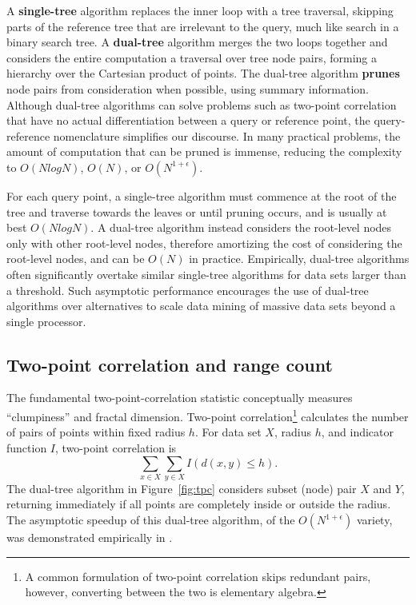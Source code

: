 \documentclass[twoside,leqno,twocolumn]{article}
\newcommand{\fig}[1]{Figure~\ref{fig:#1}}
\newcommand{\mysub}[1]{\subsection{#1} }
\newcommand{\defterm}[1]{{\bf #1}}
\begin{document}
A \defterm{single-tree} algorithm replaces the inner loop with a tree traversal, skipping parts of the reference tree that are irrelevant to the query, much like search in a binary search tree.
A \defterm{dual-tree} algorithm merges the two loops together and considers the entire computation a traversal over tree node pairs, forming a hierarchy over the Cartesian product of points.
The dual-tree algorithm \defterm{prunes} node pairs from consideration when possible, using summary information.
Although dual-tree algorithms can solve problems such as two-point correlation that have no actual differentiation between a query or reference point, the query-reference nomenclature simplifies our discourse.
In many practical problems, the amount of computation that can be pruned is immense, reducing the complexity to $O(N log N)$, $O(N)$, or $O(N^{1+\epsilon})$.

For each query point, a single-tree algorithm must commence at the root of the tree and traverse towards the leaves or until pruning occurs, and is usually at best $O(N log N)$.
A dual-tree algorithm instead considers the root-level nodes only with other root-level nodes, therefore amortizing the cost of considering the root-level nodes, and can be $O(N)$ in practice.
Empirically, dual-tree algorithms often significantly overtake similar single-tree algorithms for data sets larger than a threshold.
Such asymptotic performance encourages the use of dual-tree algorithms over alternatives to scale data mining of massive data sets beyond a single processor.

\mysub{Two-point correlation and range count}
The fundamental two-point-correlation statistic conceptually measures ``clumpiness'' and fractal dimension.
Two-point correlation\footnote{A common formulation of two-point correlation skips redundant pairs, however, converting between the two is elementary algebra.} calculates the number of pairs of points within fixed radius $h$.
For data set $X$, radius $h$, and indicator function $I$, two-point correlation is
\[\sum_{x \in X} \sum_{y \in X} I(d(x, y) \leq h).\]
\noindent
The dual-tree algorithm in \fig{tpc} considers subset (node) pair $X$ and $Y$, returning immediately if all points are completely inside or outside the radius.
The asymptotic speedup of this dual-tree algorithm, of the $O(N^{1+\epsilon})$ variety, was demonstrated empirically in \cite{gray_nbody}.
\end{document}
